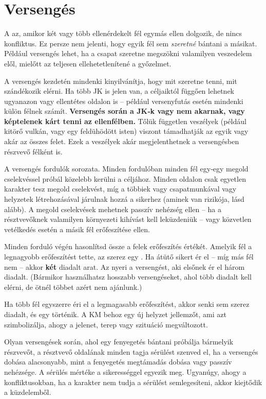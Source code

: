 \section{Versengés}

A  az, amikor két vagy több ellenérdekelt fél egymás ellen dolgozik, de nincs konfliktus. Ez persze nem jelenti, hogy egyik fél sem \emph{szeretné} bántani a másikat. Például versengés lehet, ha a csapat szeretne megszökni valamilyen veszedelem elől, mielőtt az teljesen ellehetetlenítené a győzelmet.

A versengés kezdetén mindenki kinyilvánítja, hogy mit szeretne tenni, mit szándékozik elérni. Ha több JK is jelen van, a céljaiktól függően lehetnek ugyanazon vagy ellentétes oldalon is – például versenyfutás esetén mindenki külön félnek számít. \textbf{Versengés során a JK‑k vagy nem akarnak, vagy képtelenek kárt tenni az ellenfélben.} Tőlük független veszélyek (például kitörő vulkán, vagy egy feldühödött isten) viszont támadhatják az egyik vagy akár az összes felet. Ezek a veszélyek akár megjelenthetnek a versengésben részvevő félként is.

A versengés fordulók sorozata. Minden fordulóban minden fél egy‑egy megold cselekvéssel próbál közelebb kerülni a céljához. Minden oldalon csak egyetlen karakter tesz megold cselekvést, míg a többiek vagy csapatmunkával vagy helyzetek létrehozásával járulnak hozzá a sikerhez (aminek van rizikója, lásd alább). A megold cselekvések mehetnek passzív nehézség ellen – ha a résztvevőknek valamilyen környezeti kihívást kell leküzdeniük – vagy közvetlen vetélkedés esetén a másik fél erőfeszítése ellen.

Minden forduló végén hasonlítsd össze a felek erőfeszítés értékét. Amelyik fél a legnagyobb erőfeszítést tette, az szerez egy . Ha átütő sikert ér el – míg más fél nem – akkor \textbf{két} diadalt arat. Az nyeri a versengést, aki elsőnek ér el három diadalt. (Bármikor használhatsz hosszabb versengéseket, ahol több diadalt kell elérni, de ötnél többet azért nem ajánlunk.)

Ha több fél egyszerre éri el a legmagasabb erőfeszítést, akkor senki sem szerez diadalt, és egy  történik. A KM behoz egy új helyzet jellemzőt, ami azt szimbolizálja, ahogy a jelenet, terep vagy szituáció megváltozott.

Olyan versengések során, ahol egy fenyegetés bántani próbálja bármelyik részvevőt, a résztvevő oldalának minden tagja sérülést szenved el, ha a versengés dobása alacsonyabb, mint a fenyegetés megtámadás dobása vagy passzív nehézsége. A sérülés mértéke a sikerességgel egyezik meg. Ugyanúgy, ahogy a konfliktusokban, ha a karakter nem tudja a sérülést semlegesíteni, akkor kiejtődik a küzdelemből.


